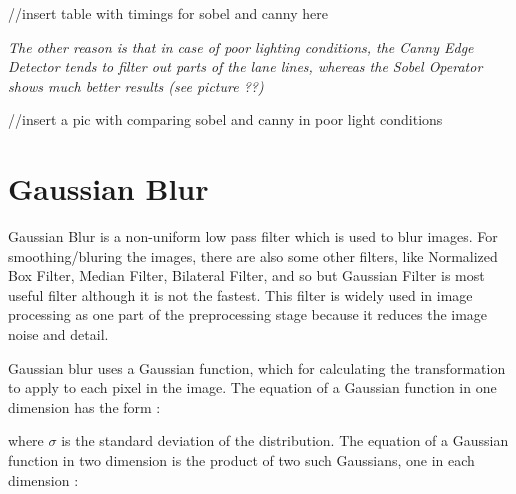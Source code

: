 //insert table with timings for sobel and canny here

\emph{\color{blue}The other reason is that in case of poor lighting conditions, the Canny Edge Detector tends to filter out parts of the lane lines, whereas the Sobel Operator shows much better results (see picture ??)}

//insert a pic with comparing sobel and canny in poor light conditions 



%
\section{Gaussian Blur}\label{sec:Gaussian Blur}

Gaussian Blur is a non-uniform low pass filter which is used to blur images. For smoothing/bluring the images, there are also some other filters, like Normalized Box Filter, Median Filter, Bilateral Filter, and so but Gaussian Filter is most useful filter although it is not the fastest. This filter is widely used in image processing as one part of the preprocessing stage because it reduces the image noise and detail.

Gaussian blur uses a Gaussian function, which for calculating the transformation to apply to each pixel in the image. The equation of a Gaussian function in one dimension has the form : 

 \begin{center}
\end{center}

where $ \sigma $ is the standard deviation of the distribution. The equation of a Gaussian function in two dimension is the product of two such Gaussians, one in each dimension : 

 \begin{center}
\end{center}




